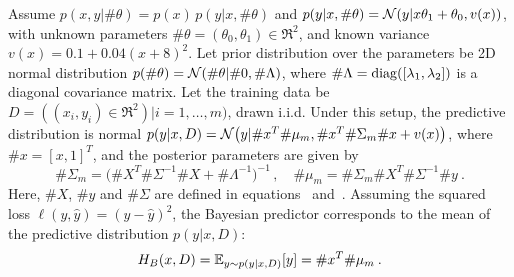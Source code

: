%
%

\begin{example}
\label{example:BLregression}Assume $p(x,y|\#\theta)=p(x)\,p(y|x,\#\theta)$
and $p(y|x,\#\theta)={\cal N}(y|x\theta_1+\theta_0,v(x))$, with unknown parameters $\#\theta=(\theta_0,\theta_1)\in\Re^2$, and known variance $v(x)=0.1+0.04(x+8)^2$. Let prior distribution over the parameters be 2D normal distribution $p(\#\theta)={\cal N}(\#\theta|\#0,\#\Lambda)$, where $\#\Lambda={\rm diag}([\lambda_1,\lambda_2])$ is a diagonal covariance matrix. Let the training data be $D=((x_i,y_i)\in\Re^2)|i=1,\ldots,m)$, drawn i.i.d.  
%
Under this setup, the predictive distribution is normal $p(y|x,D)={\cal N}\big(y|\#x^T\#\mu_m,\#x^T\#\Sigma_m\#x+v(x)\big)$, where $\#x=[x,1]^T$, and the posterior parameters are given by
\[
\#\Sigma_m=\big(\#X^T\#\Sigma^{-1}\#X+\#\Lambda^{-1} )^{-1}\,,\quad \#\mu_m=\#\Sigma_m\#X^T\#\Sigma^{-1}\#y \:.
\]
Here, $\#X$, $\#y$ and $\#\Sigma$ are defined in equations~ and~.
Assuming the squared loss $\ell(y,\hat{y})=(y-\hat{y})^2$, the Bayesian predictor corresponds to the mean of the predictive distribution $p(y|x,D)$:
\begin{equation}
\label{equ:BLpredLinReg}
   H_B(x,D) = {\mathbb{E}}_{y\sim p(y|x,D)}[y]=\#x^T\#\mu_m \:.
\end{equation}
\end{example}

